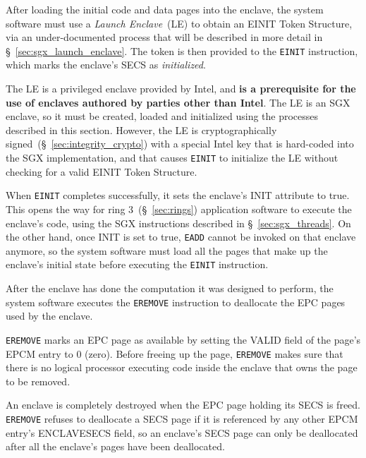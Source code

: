 After loading the initial code and data pages into the enclave, the system
software must use a \textit{Launch Enclave}~(LE) to obtain an EINIT Token
Structure, via an under-documented process that will be described in more
detail in \S~\ref{sec:sgx_launch_enclave}. The token is then provided to the
\texttt{EINIT} instruction, which marks the enclave's SECS as
\textit{initialized}.

The LE is a privileged enclave provided by Intel, and \textbf{is a prerequisite
for the use of enclaves authored by parties other than Intel}. The LE is an
SGX enclave, so it must be created, loaded and initialized using the processes
described in this section. However, the LE is cryptographically
signed~(\S~\ref{sec:integrity_crypto}) with a special Intel key that is
hard-coded into the SGX implementation, and that causes \texttt{EINIT} to
initialize the LE  without checking for a valid EINIT Token Structure.

When \texttt{EINIT} completes successfully, it sets the enclave's INIT
attribute to true. This opens the way for ring 3~(\S~\ref{sec:rings})
application software to execute the enclave's code, using the SGX instructions
described in \S~\ref{sec:sgx_threads}. On the other hand, once INIT is set to
true, \texttt{EADD} cannot be invoked on that enclave anymore, so the system
software must load all the pages that make up the enclave's initial state
before executing the \texttt{EINIT} instruction.


\label{sec:sgx_eremove}

After the enclave has done the computation it was designed to perform, the
system software executes the \texttt{EREMOVE} instruction to deallocate the
EPC pages used by the enclave.

\texttt{EREMOVE} marks an EPC page as available by setting the VALID field of
the page's EPCM entry to 0 (zero). Before freeing up the page, \texttt{EREMOVE}
makes sure that there is no logical processor executing code inside the enclave
that owns the page to be removed.

An enclave is completely destroyed when the EPC page holding its SECS is freed.
\texttt{EREMOVE} refuses to deallocate a SECS page if it is referenced by any
other EPCM entry's ENCLAVESECS field, so an enclave's SECS page can only be
deallocated after all the enclave's pages have been deallocated.
